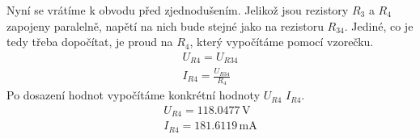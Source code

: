\par
\nopagebreak
Nyní se vrátíme k obvodu před zjednodušením.
Jelikož jsou rezistory \( R_3 \) a \( R_4 \) zapojeny paralelně, napětí na nich bude stejné jako na rezistoru \( R_{34} \).
Jediné, co je tedy třeba dopočítat, je proud na \( R_4 \), který vypočítáme pomocí vzorečku.
\[
\begin{array}{l}
U_{R4} = U_{R34} \\
I_{R4} = \frac{U_{R34}}{R_4}
\end{array}
\]
Po dosazení hodnot vypočítáme konkrétní hodnoty \( U_{R4} \) \( I_{R4} \).
\nopagebreak
\[
\begin{array}{l}
U_{R4} = 118.0477 \, \mathrm{V} \\
I_{R4} = 181.6119 \, \mathrm{mA}
\end{array}
\]